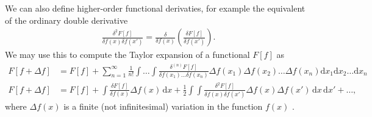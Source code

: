 \documentclass[a4paper]{article}
\newcommand{\dx}{\,\mathrm{d}x}
\newcommand{\nn}{\nonumber}
\newcommand{\comment}[1]{\ignorespaces}
\begin{document}
We can also define higher-order functional derivaties, for example the equivalent of the ordinary double derivative
\begin{align}
\frac{\delta^2 F[f]}{\delta f(x)\delta f(x')} = \frac{\delta}{\delta f(x)}\left( \frac{\delta F[f]}{\delta f(x')} \right).
\end{align}
We may use this to compute the Taylor expansion of a functional $F[f]$ as 
\begin{align}
F[f+\Delta f] &= F[f] + \sum_{n=1}^\infty \frac{1}{n!}\int  \dots \int \frac{\delta^{(n)}F[f]}{\delta f(x_1)\dots \delta f(x_n)}\Delta f(x_1)\Delta f(x_2)\dots \Delta f(x_n)\mathrm{d}x_1\mathrm{d}x_2\dots\mathrm{d}x_n \nn\\
%
F[f+\Delta f] &= F[f] + \int \frac{\delta F[f]}{\delta f(x)}\Delta f(x)\dx + \frac{1}{2}\int \int \frac{\delta^2 F[f]}{\delta f(x)\delta f(x')}\Delta f(x) \Delta f(x')\dx\,\mathrm{d}x'+\dots,
\end{align}
where $\Delta f(x)$ is a finite (not infinitesimal) variation in the function $f(x)$ \cite{yangparr}\comment{p249}.















 
\end{document}
